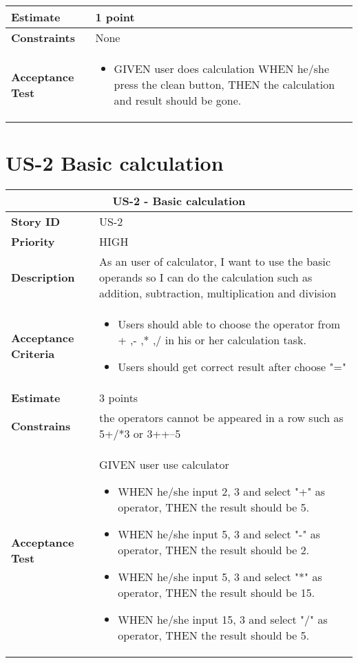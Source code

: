 \documentclass[12pt]{report}
\begin{document}
{\begin{tabular}{ |p{4cm}|p{11cm}|  }
 \\
 \hline
 \textbf{Estimate} & 1 point \\
 \hline
 \textbf{Constraints}& None \\
 \hline
 \textbf{Acceptance Test}& 
  \begin{itemize}
     \item GIVEN user does calculation WHEN he/she press the clean button, THEN the calculation and result should be gone.
\end{itemize}
 
 \\
 \hline
\end{tabular}

\section{US-2 Basic calculation}
\begin{tabular}{ |p{4cm}|p{11cm}| }
 \hline
 \multicolumn{2}{|c|}{US-2 - Basic calculation} \\
 \hline
 \textbf {Story ID}& US-2 \\
 \hline
   \textbf{Priority} & HIGH \\
 \hline
  \textbf{Description}   & As an user of calculator, I want to use the basic operands so I can do the calculation such as addition, subtraction, multiplication and division  \\
\hline
     \textbf{Acceptance Criteria}& 
     \begin{itemize}
     \item Users should able to choose the operator from + ,- ,* ,/ in his or her calculation task.
     \item Users should get correct result after choose "="
     \end{itemize}
     \\
\hline
 \textbf{Estimate} & 3 points \\
 \hline
\textbf{Constrains}& the operators cannot be appeared in a row such as 5+/*3 or 3++--5 \\
 \hline
     \textbf{Acceptance Test}& 
     GIVEN user use calculator
     \begin{itemize}
          \item  WHEN he/she input 2, 3 and select "+" as operator, THEN the result should be 5.
          \item  WHEN he/she input 5, 3 and select "-" as operator, THEN the result should be 2.
         \item  WHEN he/she input 5, 3 and select "*" as operator, THEN the result should be 15.
         \item  WHEN he/she input 15, 3 and select "/" as operator, THEN the result should be 5.
     \end{itemize}
     \\
\hline


\end{tabular}}
\end{document}
